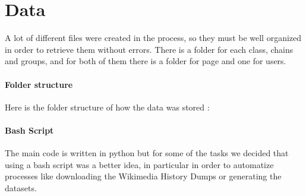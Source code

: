 \section{Data}
A lot of different files were created in the process, so they must be well organized in order to retrieve them
without errors. There is a folder for each class, chains and groups, and for both of them there is
a folder for page and one for users.

\paragraph*{Folder structure}
Here is the folder structure of how the data was stored :  


\paragraph*{Bash Script}
The main code is written in python but for some of the tasks we decided that using a bash
script was a better idea, in particular in order to automatize processes like downloading the Wikimedia History Dumps or
generating the datasets.





